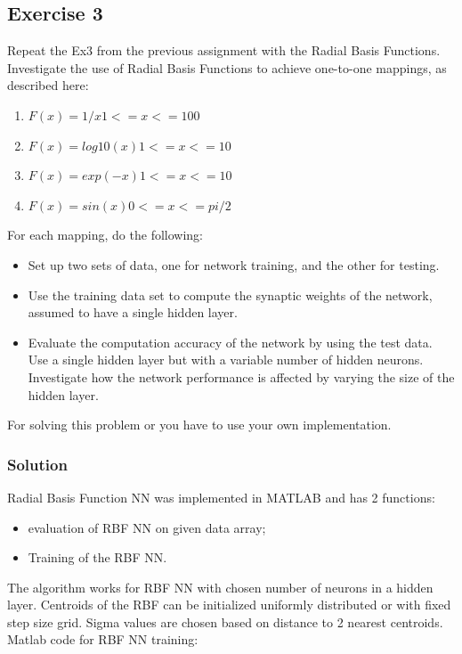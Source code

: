 \documentclass[a4paper, 12pt]{article}
\begin{document}
\subsection{Exercise 3}
Repeat the Ex3 from the previous assignment with the Radial Basis Functions. Investigate the use of Radial Basis Functions to achieve one-to-one mappings, as described here:
\begin{enumerate}
\item $F(x) = 1/x 1<=x<=100$

\item $F(x) = log10(x) 1<=x<=10$

\item $F(x) = exp(-x) 1<=x<=10$

\item $F(x) = sin(x) 0<=x<=pi/2$
\end{enumerate}
For each mapping, do the following:
\begin{itemize}
\item Set up two sets of data, one for network training, and the other for testing.

\item Use the training data set to compute the synaptic weights of the network, assumed to have a single hidden layer.

\item Evaluate the computation accuracy of the network by using the test data. Use a single hidden layer but with a variable number of hidden neurons. Investigate how the network performance is affected by varying the size of the hidden layer.
\end{itemize}
For solving this problem or you have to use your own implementation.

\subsubsection{Solution}

Radial Basis Function NN was implemented in MATLAB and has 2 functions:
\begin{itemize}
\item evaluation of RBF NN on given data array;

\item Training of the RBF NN.
\end{itemize}

The algorithm works for RBF NN with chosen number of neurons in a hidden layer. Centroids of the RBF can be initialized uniformly distributed or with fixed step size grid. Sigma values are chosen based on distance to 2 nearest centroids.
\medskip
Matlab code for RBF NN training:
\end{document}
